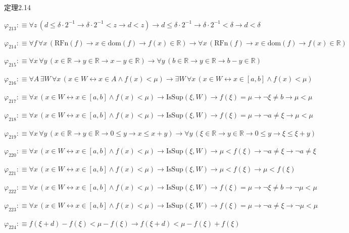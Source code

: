 \begin{fullproof}{定理2.14}
\begin{abbrevlist}
\item $\varphi_{213} :\equiv \forall z\,(d \leq \delta \cdot 2^{-1} \to \delta \cdot 2^{-1} < z \to d < z) \to d \leq \delta \cdot 2^{-1} \to \delta \cdot 2^{-1} < \delta \to d < \delta$
\item $\varphi_{214} :\equiv \forall f\,\forall x\,(\mathrm{RFn}(f) \to x \in \mathrm{dom}(f) \to f(x) \in \mathbb{R}) \to \forall x\,(\mathrm{RFn}(f) \to x \in \mathrm{dom}(f) \to f(x) \in \mathbb{R})$
\item $\varphi_{215} :\equiv \forall x\,\forall y\,(x \in \mathbb{R} \to y \in \mathbb{R} \to x - y \in \mathbb{R}) \to \forall y\,(b \in \mathbb{R} \to y \in \mathbb{R} \to b - y \in \mathbb{R})$
\item $\varphi_{216} :\equiv \forall A\,\exists W\,\forall x\,(x \in W \leftrightarrow x \in A \land f(x) < \mu) \to \exists W\,\forall x\,(x \in W \leftrightarrow x \in [a,b] \land f(x) < \mu)$
\item $\varphi_{217} :\equiv \forall x\,(x \in W \leftrightarrow x \in [a,b] \land f(x) < \mu) \to \mathrm{IsSup}(\xi,W) \to f(\xi) = \mu \to \neg \xi \neq b \to \mu < \mu$
\item $\varphi_{218} :\equiv \forall x\,(x \in W \leftrightarrow x \in [a,b] \land f(x) < \mu) \to \mathrm{IsSup}(\xi,W) \to f(\xi) = \mu \to \neg a \neq \xi \to \mu < \mu$
\item $\varphi_{219} :\equiv \forall x\,\forall y\,(x \in \mathbb{R} \to y \in \mathbb{R} \to 0 \leq y \to x \leq x + y) \to \forall y\,(\xi \in \mathbb{R} \to y \in \mathbb{R} \to 0 \leq y \to \xi \leq \xi + y)$
\item $\varphi_{220} :\equiv \forall x\,(x \in W \leftrightarrow x \in [a,b] \land f(x) < \mu) \to \mathrm{IsSup}(\xi,W) \to \mu < f(\xi) \to \neg a \neq \xi \to \neg a \neq \xi$
\item $\varphi_{221} :\equiv \forall x\,(x \in W \leftrightarrow x \in [a,b] \land f(x) < \mu) \to \mathrm{IsSup}(\xi,W) \to \mu < f(\xi) \to \mu < f(\xi)$
\item $\varphi_{222} :\equiv \forall x\,(x \in W \leftrightarrow x \in [a,b] \land f(x) < \mu) \to \mathrm{IsSup}(\xi,W) \to f(\xi) = \mu \to \neg \xi \neq b \to \neg \mu < \mu$
\item $\varphi_{223} :\equiv \forall x\,(x \in W \leftrightarrow x \in [a,b] \land f(x) < \mu) \to \mathrm{IsSup}(\xi,W) \to f(\xi) = \mu \to \neg a \neq \xi \to \neg \mu < \mu$
\item $\varphi_{224} :\equiv f(\xi + d) - f(\xi) < \mu - f(\xi) \to f(\xi + d) < \mu - f(\xi) + f(\xi)$

\end{abbrevlist}
\end{fullproof}

